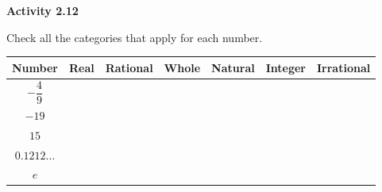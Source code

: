 \vspace{0.3ex}
\noindent\textbf{Activity 2.12}

\vspace{0.2ex}


Check all the categories that apply for each number.

{\fontsize{8}{11}\selectfont
\noindent\begin{tabular}{|c|c|c|c|c|c|c|}
\hline
\textbf{Number} & \textbf{Real} & \textbf{Rational} & \textbf{Whole} & \textbf{Natural} & \textbf{Integer} & \textbf{Irrational} \\
\hline
$-\dfrac{4}{9}$ & & & & & & \\
\hline
$-19$ & & & & & & \\
\hline
$15$ & & & & & & \\
\hline
$0.1212\ldots$ & & & & & & \\
\hline
$e$ & & & & & & \\
\hline
\end{tabular}
}
